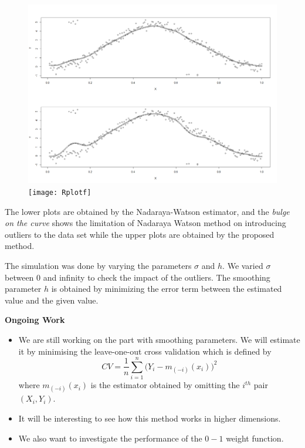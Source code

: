 \documentclass[11pt]{article}
\begin{document}
\begin{flushleft}
\begin{figure}[ht]
\begin{center}
\includegraphics[scale=0.2]{Rplot03}
\texttt{[image: Rplotf]}
\end{center}
\end{figure}
 
The lower plots are obtained by the Nadaraya-Watson estimator, and the {\it bulge on the curve} shows the limitation of Nadaraya Watson method on introducing outliers to the data set while the upper plots are obtained by the proposed method.

The simulation was done by varying the parameters $\sigma$ and $h$. We varied $\sigma$ between 0 and infinity to check the impact of the outliers. The smoothing parameter $h$ is obtained by minimizing the error term between the estimated value and the given value. 

\vspace{0.1in}
\textbf{Ongoing Work}
\vspace{0.1in}
\begin{itemize}
 \item We are still working on the part with smoothing parameters. We will estimate it by minimising  the leave-one-out cross
validation which is defined by 
$$ CV=\frac{1}{n}\displaystyle{\sum\limits_{i=1}^n(Y_i-m_{(-i)}(x_i)})^2$$
where $m_{(-i)}(x_i)$
is the estimator obtained by omitting the $i^{th}$
pair $(X_i
, Y_i)$.
 \item It will be interesting to see how this method works in higher dimensions.
 \item We also want to investigate the performance of the $0-1$ weight function.
\end{itemize}



\end{flushleft}
\end{document}
